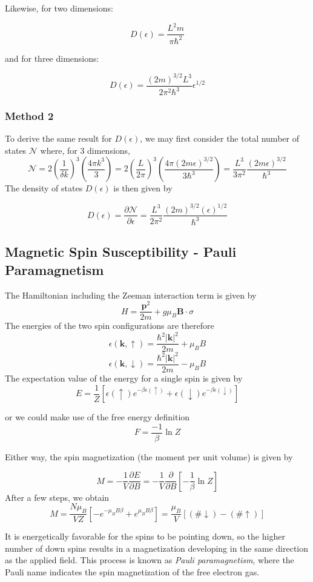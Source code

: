 \documentclass[10pt]{article}
\begin{document}
Likewise, for two dimensions:

$$D(\epsilon) = \frac{L^{2}m}{\pi \hbar^{2}}$$

and for three dimensions:

$$D(\epsilon) = \frac{(2m)^{3/2}L^{3}}{2\pi^{2}\hbar^{3}}\epsilon^{1/2}$$

\subsubsection{Method 2}
To derive the same result for $D(\epsilon)$, we may first consider the total number of states $\mathcal{N}$ where, for $3$ dimensions,
$$\mathcal{N} = 2 \left (\frac{1}{\delta k}\right)^{3}\left (\frac{4\pi k^{3}}{3}\right ) = 2 \left ( \frac{L}{2\pi} \right)^{3} \left (\frac{4\pi (2m\epsilon)^{3/2}}{3\hbar^{3}} \right ) = \frac{L^{3}}{3\pi^{2}}\frac{(2m\epsilon)^{3/2}}{\hbar^{3}}$$
The density of states $D(\epsilon)$ is then given by

$$
D(\epsilon) = \frac{\partial \mathcal{N}}{\partial \epsilon} = \frac{L^{3}}{2\pi^{2}}\frac{(2m)^{3/2}(\epsilon)^{1/2}}{\hbar^{3}}
$$

\subsection{Magnetic Spin Susceptibility - Pauli Paramagnetism}
The Hamiltonian including the Zeeman interaction term is given by
$$
H = \frac{\textbf{p}^{2}}{2m} + g\mu_{B}\textbf{B}\cdot\sigma
$$
The energies of the two spin configurations are therefore
$$
\epsilon(\textbf{k}, \uparrow) = \frac{\hbar^{2}|\textbf{k}|^{2}}{2m} + \mu_{B}B
$$
$$
\epsilon(\textbf{k}, \downarrow) = \frac{\hbar^{2}|\textbf{k}|^{2}}{2m} - \mu_{B}B
$$
The expectation value of the energy for a single spin is given by
$$E = \frac{1}{Z}\left [ \epsilon(\uparrow)e^{-\beta \epsilon(\uparrow)} + \epsilon(\downarrow)e^{-\beta \epsilon(\downarrow)}\right ]$$

or we could make use of the free energy definition
$$F = \frac{-1}{\beta}\ln Z$$

Either way, the spin magnetization (the moment per unit volume) is given by

$$
M = -\frac{1}{V}\frac{\partial E}{\partial B} = -\frac{1}{V}\frac{\partial}{\partial B}\left [ -\frac{1}{\beta}\ln Z\right ]
$$
After a few steps, we obtain
$$
M = \frac{N\mu_{B}}{VZ}\left [  -e^{-\mu_{B}B\beta} + e^{\mu_{B}B\beta}\right ] = \frac{\mu_{B}}{V}[(\# \downarrow) - (\# \uparrow)]
$$

It is energetically favorable for the spins to be pointing down, so the higher number of down spins results in a magnetization developing in the same direction
as the applied field. This process is known as \emph{Pauli paramagnetism}, where the Pauli name indicates the spin magnetization of the
free electron gas.
\end{document}
